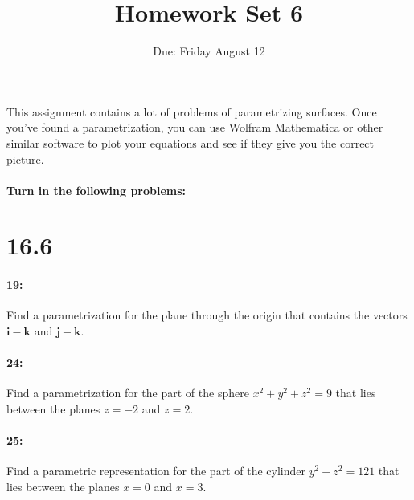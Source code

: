 \documentclass[10pt,letter]{article}
\renewcommand{\i}{\mathbf{i}}
\renewcommand{\j}{\mathbf{j}}
\renewcommand{\k}{\mathbf{k}}
\begin{document}


\title{Homework Set 6}


\date{Due: Friday August 12 }
 
\maketitle 

\paragraph{}
This assignment contains a lot of problems of parametrizing surfaces. Once you've found a parametrization, you can use Wolfram Mathematica or other similar software to plot your equations and see if they give you the correct picture.
\paragraph{Turn in the following problems:}
\section*{16.6}

\paragraph{19: } Find a parametrization for the plane through the origin that contains the vectors $ \i-\k$ and $\j-\k$.
\paragraph{24:} Find a parametrization for the part of the sphere $x^2+y^2+z^2=9$ that lies between the planes $z=-2$ and $z=2$.
\paragraph{25:} Find a parametric representation for the part of the cylinder $y^2+z^2=121$ that lies between the planes $x=0$ and $x=3$.
\end{document}
